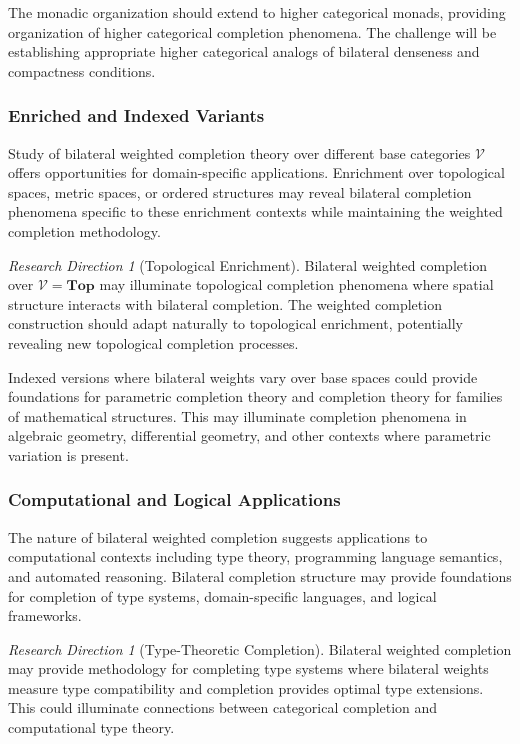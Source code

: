 \documentclass[11pt]{article}
\theoremstyle{plain}
\theoremstyle{definition}
\theoremstyle{remark}
\newtheorem{research_direction}[theorem]{Research Direction}
\newcommand{\V}{\mathcal{V}}
\begin{document}
The monadic organization should extend to higher categorical monads, providing organization of higher categorical completion phenomena. The challenge will be establishing appropriate higher categorical analogs of bilateral denseness and compactness conditions.

\subsubsection{Enriched and Indexed Variants}

Study of bilateral weighted completion theory over different base categories $\V$ offers opportunities for domain-specific applications. Enrichment over topological spaces, metric spaces, or ordered structures may reveal bilateral completion phenomena specific to these enrichment contexts while maintaining the weighted completion methodology.

\begin{research_direction}[Topological Enrichment]
Bilateral weighted completion over $\V = \mathbf{Top}$ may illuminate topological completion phenomena where spatial structure interacts with bilateral completion. The weighted completion construction should adapt naturally to topological enrichment, potentially revealing new topological completion processes.
\end{research_direction}

Indexed versions where bilateral weights vary over base spaces could provide foundations for parametric completion theory and completion theory for families of mathematical structures. This may illuminate completion phenomena in algebraic geometry, differential geometry, and other contexts where parametric variation is present.

\subsubsection{Computational and Logical Applications}

The nature of bilateral weighted completion suggests applications to computational contexts including type theory, programming language semantics, and automated reasoning. Bilateral completion structure may provide foundations for completion of type systems, domain-specific languages, and logical frameworks.

\begin{research_direction}[Type-Theoretic Completion]
Bilateral weighted completion may provide methodology for completing type systems where bilateral weights measure type compatibility and completion provides optimal type extensions. This could illuminate connections between categorical completion and computational type theory.
\end{research_direction}
\end{document}
